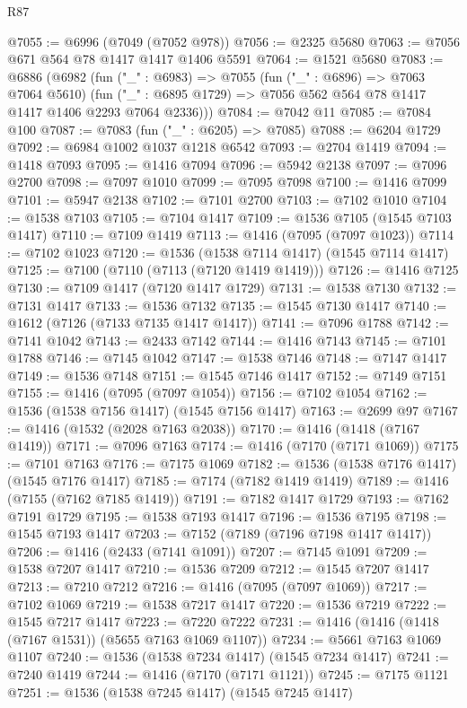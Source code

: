 \begin{lexlean}{R87}
\begin{coremodule}
{{@7055 := @6996 (@7049 (@7052 @978))
@7056 := @2325 @5680
@7063 := @7056 @671 @564 @78 @1417 @1417 @1406 @5591
@7064 := @1521 @5680
@7083 := @6886
    (@6982
      (fun ("_" : @6983) =>
      @7055
        (fun ("_" : @6896) => @7063 @7064 @5610)
        (fun ("_" : @6895 @1729) => @7056 @562 @564 @78 @1417 @1417 @1406 @2293 @7064 @2336)))
@7084 := @7042 @11
@7085 := @7084 @100
@7087 := @7083 (fun ("_" : @6205) => @7085)
@7088 := @6204 @1729
@7092 := @6984 @1002 @1037 @1218 @6542
@7093 := @2704 @1419
@7094 := @1418 @7093
@7095 := @1416 @7094
@7096 := @5942 @2138
@7097 := @7096 @2700
@7098 := @7097 @1010
@7099 := @7095 @7098
@7100 := @1416 @7099
@7101 := @5947 @2138
@7102 := @7101 @2700
@7103 := @7102 @1010
@7104 := @1538 @7103
@7105 := @7104 @1417
@7109 := @1536 @7105 (@1545 @7103 @1417)
@7110 := @7109 @1419
@7113 := @1416 (@7095 (@7097 @1023))
@7114 := @7102 @1023
@7120 := @1536 (@1538 @7114 @1417) (@1545 @7114 @1417)
@7125 := @7100 (@7110 (@7113 (@7120 @1419 @1419)))
@7126 := @1416 @7125
@7130 := @7109 @1417 (@7120 @1417 @1729)
@7131 := @1538 @7130
@7132 := @7131 @1417
@7133 := @1536 @7132
@7135 := @1545 @7130 @1417
@7140 := @1612 (@7126 (@7133 @7135 @1417 @1417))
@7141 := @7096 @1788
@7142 := @7141 @1042
@7143 := @2433 @7142
@7144 := @1416 @7143
@7145 := @7101 @1788
@7146 := @7145 @1042
@7147 := @1538 @7146
@7148 := @7147 @1417
@7149 := @1536 @7148
@7151 := @1545 @7146 @1417
@7152 := @7149 @7151
@7155 := @1416 (@7095 (@7097 @1054))
@7156 := @7102 @1054
@7162 := @1536 (@1538 @7156 @1417) (@1545 @7156 @1417)
@7163 := @2699 @97
@7167 := @1416 (@1532 (@2028 @7163 @2038))
@7170 := @1416 (@1418 (@7167 @1419))
@7171 := @7096 @7163
@7174 := @1416 (@7170 (@7171 @1069))
@7175 := @7101 @7163
@7176 := @7175 @1069
@7182 := @1536 (@1538 @7176 @1417) (@1545 @7176 @1417)
@7185 := @7174 (@7182 @1419 @1419)
@7189 := @1416 (@7155 (@7162 @7185 @1419))
@7191 := @7182 @1417 @1729
@7193 := @7162 @7191 @1729
@7195 := @1538 @7193 @1417
@7196 := @1536 @7195
@7198 := @1545 @7193 @1417
@7203 := @7152 (@7189 (@7196 @7198 @1417 @1417))
@7206 := @1416 (@2433 (@7141 @1091))
@7207 := @7145 @1091
@7209 := @1538 @7207 @1417
@7210 := @1536 @7209
@7212 := @1545 @7207 @1417
@7213 := @7210 @7212
@7216 := @1416 (@7095 (@7097 @1069))
@7217 := @7102 @1069
@7219 := @1538 @7217 @1417
@7220 := @1536 @7219
@7222 := @1545 @7217 @1417
@7223 := @7220 @7222
@7231 := @1416 (@1416 (@1418 (@7167 @1531)) (@5655 @7163 @1069 @1107))
@7234 := @5661 @7163 @1069 @1107
@7240 := @1536 (@1538 @7234 @1417) (@1545 @7234 @1417)
@7241 := @7240 @1419
@7244 := @1416 (@7170 (@7171 @1121))
@7245 := @7175 @1121
@7251 := @1536 (@1538 @7245 @1417) (@1545 @7245 @1417)
}}
\end{coremodule}
\end{lexlean}
